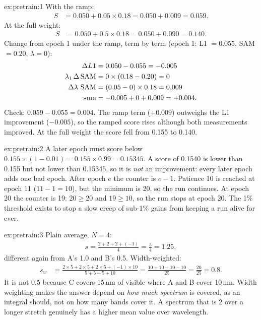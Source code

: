 
\begin{solution}{ex:pretrain:1}
With the ramp:
\begin{align*}
  S &= 0.050 + 0.05 \times 0.18 = 0.050 + 0.009 = 0.059.
\end{align*}
At the full weight:
\begin{align*}
  S &= 0.050 + 0.5 \times 0.18 = 0.050 + 0.090 = 0.140.
\end{align*}
Change from epoch 1 under the ramp, term by term (epoch 1: L1 $= 0.055$, SAM $= 0.20$, $\lambda = 0$):
\begin{align*}
  \Delta L1 &= 0.050 - 0.055 = -0.005\\
  \lambda_1\,\Delta\operatorname{SAM} &= 0 \times (0.18 - 0.20) = 0\\
  \Delta\lambda\,\operatorname{SAM} &= (0.05 - 0) \times 0.18 = 0.009\\
  \text{sum} &= -0.005 + 0 + 0.009 = +0.004.
\end{align*}
Check: $0.059 - 0.055 = 0.004$. The ramp term ($+0.009$) outweighs the L1 improvement ($-0.005$), so the ramped score rises
although both measurements improved. At the full weight the score fell from 0.155 to 0.140.
\end{solution}

\begin{solution}{ex:pretrain:2}
A later epoch must score below $0.155 \times (1 - 0.01) = 0.155 \times 0.99 = 0.15345$. A score of 0.1540 is lower than 0.155
but not lower than 0.15345, so it is \emph{not} an improvement: every later epoch adds one bad epoch. After epoch $e$ the counter
is $e - 1$. Patience 10 is reached at epoch 11 ($11 - 1 = 10$), but the minimum is 20, so the run continues. At epoch 20 the counter
is 19: $20 \ge 20$ and $19 \ge 10$, so the run stops at epoch 20. The 1\% threshold exists to stop a slow creep of sub-1\% gains
from keeping a run alive for ever.
\end{solution}

\begin{solution}{ex:pretrain:3}
Plain average, $N = 4$:
\begin{align*}
  s = \frac{2 + 2 + 2 + (-1)}{4} = \frac{5}{4} = 1.25,
\end{align*}
different again from A's 1.0 and B's 0.5. Width-weighted:
\begin{align*}
  s_w &= \frac{2 \times 5 + 2 \times 5 + 2 \times 5 + (-1) \times 10}{5 + 5 + 5 + 10}
       = \frac{10 + 10 + 10 - 10}{25} = \frac{20}{25} = 0.8.
\end{align*}
It is not 0.5 because C covers 15\,nm of visible where A and B cover 10\,nm. Width weighting makes the answer depend on
\emph{how much spectrum} is covered, as an integral should, not on how many bands cover it. A spectrum that is 2 over a longer
stretch genuinely has a higher mean value over wavelength.
\end{solution}

